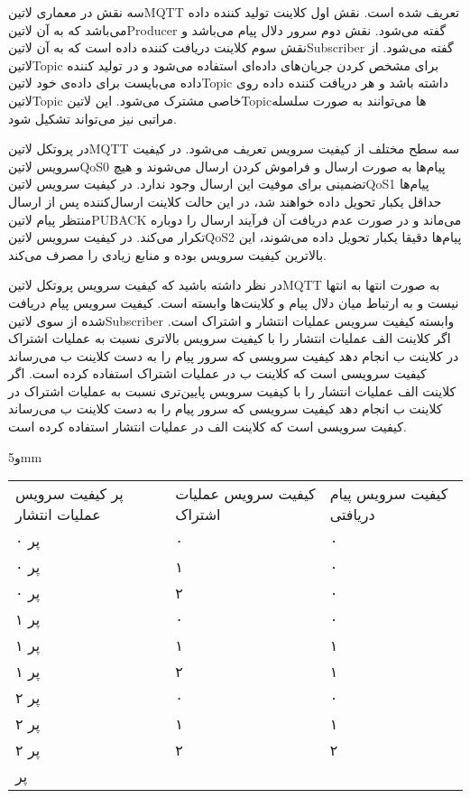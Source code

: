 سه نقش در معماری ‌لاتین{MQTT} تعریف شده است. نقش اول کلاینت تولید کننده داده می‌باشد که به آن ‌لاتین{Producer} گفته می‌شود. نقش دوم سرور دلال پیام می‌باشد و نقش سوم کلاینت دریافت کننده داده است که به آن ‌لاتین{Subscriber} گفته می‌شود.
از ‌لاتین{Topic} برای مشخص کردن جریان‌های داده‌ای استفاده می‌شود و در تولید کننده داده می‌بایست برای داده‌ی خود ‌لاتین{Topic} داشته باشد و هر دریافت کننده داده روی ‌لاتین{Topic} خاصی مشترک می‌شود.
این ‌لاتین{Topic}ها می‌توانند به صورت سلسله مراتبی نیز می‌تواند تشکیل شود.

در پروتکل ‌لاتین{‌MQTT} سه سطح مختلف از کیفیت سرویس تعریف می‌شود. در کیفیت سرویس ‌لاتین{QoS0} پیام‌ها به صورت ارسال و فراموش کردن ارسال می‌شوند و هیچ تضمینی برای موفیت این ارسال وجود ندارد.
در کیفیت سرویس ‌لاتین{QoS1} پیام‌ها حداقل یکبار تحویل داده خواهند شد، در این حالت کلاینت ارسال‌کننده پس از ارسال منتظر پیام ‌لاتین{PUBACK} می‌ماند و در صورت عدم دریافت آن فرآیند ارسال را دوباره تکرار می‌کند.
در کیفیت سرویس ‌لاتین{QoS2} پیام‌ها دقیقا یکبار تحویل داده می‌شوند، این بالاترین کیفیت سرویس بوده و منابع زیادی را مصرف می‌کند.

در نظر داشته باشید که کیفیت سرویس پروتکل ‌لاتین{MQTT} به صورت انتها به انتها نیست و به ارتباط میان دلال پیام و کلاینت‌ها وابسته است.
کیفیت سرویس پیام دریافت شده از سوی ‌لاتین{Subscriber} وابسته کیفیت سرویس عملیات انتشار و اشتراک است. اگر کلاینت الف عملیات انتشار را با کیفیت سرویس بالاتری
نسبت به عملیات اشتراک در کلاینت ب انجام دهد کیفیت سرویسی که سرور پیام را به دست کلاینت ب می‌رساند کیفیت سرویسی است که کلاینت ب در عملیات اشتراک استفاده کرده است.
اگر کلاینت الف عملیات انتشار را با کیفیت سرویس پایین‌تری نسبت به عملیات اشتراک در کلاینت ب انجام دهد کیفیت سرویسی که سرور پیام را به دست کلاینت ب می‌رساند کیفیت سرویسی است که
کلاینت الف در عملیات انتشار استفاده کرده است.

‌و{5mm}
\begin{tabularx}{\textwidth}{|X|X|X|}
‌پر
کیفیت سرویس عملیات انتشار & کیفیت سرویس عملیات اشتراک & کیفیت سرویس پیام دریافتی \\
‌پر
۰ & ۰ & ۰ \\
‌پر
۰ & ۱ & ۰ \\
‌پر
۰ & ۲ & ۰ \\
‌پر
۱ & ۰ & ۰ \\
‌پر
۱ & ۱ & ۱ \\
‌پر
۱ & ۲ & ۱ \\
‌پر
۲ & ۰ & ۰ \\
‌پر
۲ & ۱ & ۱ \\
‌پر
۲ & ۲ & ۲ \\
‌پر
\end{tabularx}


